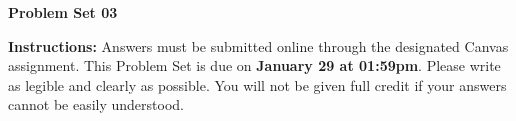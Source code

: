 \documentclass[12pt]{exam}
\newcommand{\examdate}{\fontfamily{lmss} \textbf{January 29 at 01:59pm}} %
\begin{document}
\selectfont

\begin{center}
    \textbf{{\LARGE Problem Set 03}} \\
    \bigskip 
\end{center}

\noindent \textbf{Instructions:} 
Answers must be submitted online through the designated Canvas assignment. 
This Problem Set is due on \examdate.
Please write as legible and clearly as possible. 
You will not be given full credit if your answers cannot be easily understood. 


\end{document}

